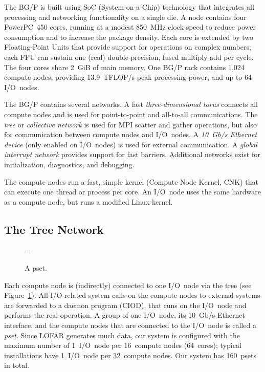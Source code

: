 \documentclass[journal]{IEEEtran}
\begin{document}


The BG/P is built using SoC (System-on-a-Chip) technology that integrates
all processing and networking functionality on a single die.
A node contains four PowerPC~450 cores, running at a modest 850~MHz clock
speed to reduce power consumption and to increase the package density.
Each core is extended by two Floating-Point Units that provide support for
operations on complex numbers; each FPU can sustain one (real) double-precision,
fused multiply-add per cycle.
The four cores share 2~GiB of main memory.
One BG/P rack contains 1,024 compute nodes, providing 13.9~TFLOP/s peak
processing power, and up to 64 I/O~nodes.

The BG/P contains several networks.
A fast \emph{three-dimensional torus\/} connects all compute nodes and is used
for point-to-point and all-to-all communications.
The \emph{tree\/} or \emph{collective network\/} is used for MPI scatter and
gather operations, but also for communication between compute nodes and
I/O~nodes.
A \emph{10~Gb/s Ethernet device\/} (only enabled on I/O~nodes) is used for
external communication.
A \emph{global interrupt network\/} provides support for fast barriers.
Additional networks exist for initialization, diagnostics, and debugging.

The compute nodes run a fast, simple kernel (Compute Node Kernel, CNK) that
can execute one thread or process per core.
An I/O~node uses the same hardware as a compute node, but runs a modified
Linux kernel.


\subsection{The Tree Network}

\begin{figure}[h]
\epsfxsize=\columnwidth
{}
\caption{A pset.}
\label{fig:pset}
\end{figure}

Each compute node is (indirectly) connected to one I/O~node via the tree
(see Figure~\ref{fig:pset}).
All I/O-related system calls on the compute nodes to external systems are
forwarded to a daemon program (CIOD), that runs on the
I/O~node and performs the real operation.
A group of one I/O~node, its 10~Gb/s Ethernet interface, and the compute
nodes that are connected to the I/O~node is called a \emph{pset}.
Since LOFAR generates much data, our system is configured with
the maximum number of 1~I/O~node per 16~compute nodes (64~cores); typical
installations have 1~I/O~node per 32~compute nodes.
Our system has 160~psets in total.
\end{document}

